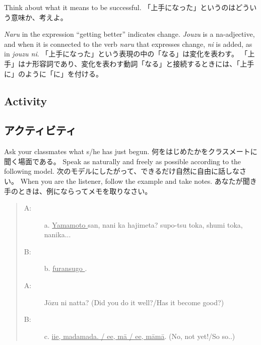 \documentclass[uplatex,dvipdfmx,b5paper,english,10pt]{jsbook}
\begin{document}
\begin{toiquestion}
\ifEnglish
Think about what it means to be successful.
\else
「上手になった」というのはどういう意味か、考えよ。
\fi
\end{toiquestion}

\begin{toianswer}
\ifEnglish
{\it Naru\/} in the expression ``getting better'' indicates change.
{\it Jouzu\/} is a na-adjective, and when it is connected to the verb {\it naru\/} that expresses change, {\it ni\/} is added, as in {\it jouzu ni\/}.
\else
「上手になった」という表現の中の「なる」は変化を表わす。
「上手」はナ形容詞であり、変化を表わす動詞「なる」と接続するときには、「上手に」のように「に」を付ける。
\fi
\end{toianswer}

\ifEnglish %
\subsection{Activity}
\else
\subsection{アクティビティ}
\fi

\begin{toiquestion}
\ifEnglish
Ask your classmates what s/he has just begun.
\else
何をはじめたかをクラスメートに聞く場面である。
\fi
\ifEnglish
Speak as naturally and freely as possible according to the following model.
\else
次のモデルにしたがって、できるだけ自然に自由に話しなさい。
\fi
\ifEnglish
When you are the listener, follow the example and take notes.
\else
あなたが聞き手のときは、例にならってメモを取りなさい。
\fi
\end{toiquestion}

\begin{quote}
\begin{description}
 \item[A:] a. \underline{ Yamamoto } san, nani ka hajimeta? supo-tsu toka, shumi toka, nanika...
 \item[B:] b. \underline{ furansugo }.
 \item[A:] J\={o}zu ni natta? (Did you do it well?/Has it become good?)
 \item[B:] c. \underline{ iie, madamada. / ee, m\={a} / ee, m\={a}m\={a}}. (No, not yet!/So so..)
\end{description}
\end{quote}
\end{document}
